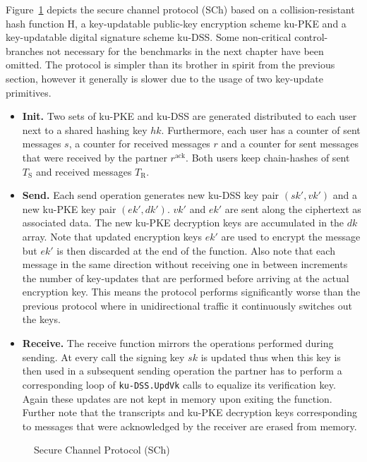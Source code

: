 \documentclass[11pt,a4paper,twoside,openright,bibliography=totoc]{scrbook}
\renewcommand{\t}{\text} %
\begin{document}
Figure~\ref{fig:secure-channel} depicts the secure channel
protocol (SCh) based on a collision-resistant
hash function H, a key-updatable public-key encryption scheme ku-PKE and
a key-updatable digital signature scheme ku-DSS. Some non-critical
control-branches not necessary for the benchmarks in the next chapter
have been omitted. The protocol is simpler than
its brother in spirit from the previous section, however it
generally is slower due to the usage of two key-update primitives.
\begin{itemize}
\item \textbf{Init.} Two sets of ku-PKE and ku-DSS are generated
  distributed to each user next to a shared hashing key $hk$. Furthermore,
  each user has a counter of sent messages $s$, a counter for received messages
  $r$ and a counter for sent messages that were received by the partner
  $r^\t{ack}$. Both users keep chain-hashes of sent $T_\t{S}$ and received
  messages $T_\t{R}$.
\item \textbf{Send.} Each send operation generates new ku-DSS key pair
  $(sk',vk')$ and a new ku-PKE key pair $(ek',dk')$. $vk'$ and $ek'$ are sent
  along the ciphertext as associated data. The new ku-PKE decryption keys
  are accumulated in the $dk$ array. Note that updated encryption keys $ek'$
  are used to encrypt the message but $ek'$ is then discarded at the end of
  the function. Also note that each message in the same direction
  without receiving one in between increments the number of key-updates
  that are performed before arriving at the actual encryption key. This
  means the protocol performs significantly worse than the previous
  protocol where in unidirectional traffic it continuously switches
  out the keys.
\item \textbf{Receive.} The receive function mirrors the operations
  performed during sending. At every call the signing key $sk$ is updated
  thus when this key is then used in a subsequent sending operation the
  partner has to perform a corresponding loop of \texttt{ku-DSS.UpdVk}
  calls to equalize its verification key. Again these updates
  are not kept in memory upon exiting the function. Further note
  that the transcripts and ku-PKE decryption keys corresponding to messages
  that were acknowledged by the receiver are erased from memory.
\end{itemize}

\begin{figure}[p]
  \centering
  \setlength{\fboxsep}{10pt}
  \scalebox{0.9}{%
    \fbox{%
      
    }
  }
  \caption{Secure Channel Protocol (SCh)}
  \label{fig:secure-channel}
\end{figure}
\end{document}
